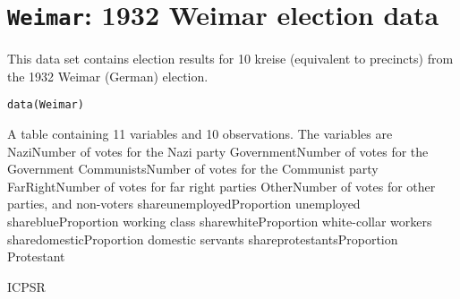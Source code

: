  \section{{\tt Weimar}: 1932 Weimar election data}\label{ss:Weimar}
\begin{Description}\relax
This data set contains election results for 10 kreise (equivalent to precincts) from the 1932 Weimar (German) election.
\end{Description}
\begin{Usage}
\begin{verbatim}data(Weimar)\end{verbatim}
\end{Usage}
\begin{Format}\relax
A table containing 11 variables and 10 observations.  The variables are {
{Nazi}{Number of votes for the Nazi party}
{Government}{Number of votes for the Government}
{Communists}{Number of votes for the Communist party}
{FarRight}{Number of votes for far right parties}
{Other}{Number of votes for other parties, and non-voters}
{shareunemployed}{Proportion unemployed}
{shareblue}{Proportion working class}
{sharewhite}{Proportion white-collar workers}
{sharedomestic}{Proportion domestic servants}
{shareprotestants}{Proportion Protestant} 
}
\end{Format}
\begin{Source}\relax
ICPSR
\end{Source}


